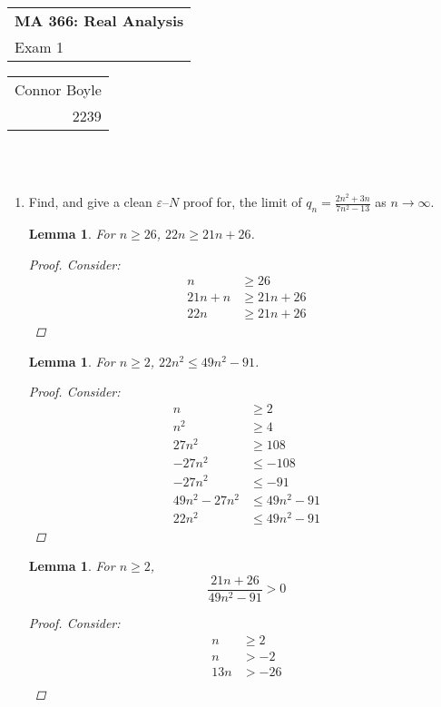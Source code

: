 \documentclass{amsart}
\def\name{Connor Boyle} %
\def\CM{2239} %
\def\hwnum{1} %
\newtheorem{lemma}[theorem]{Lemma}
\begin{document}
\noindent
\thispagestyle{firststyle}
\begin{tabular}{l}
{\LARGE \textbf{MA 366: Real Analysis} }\\
{\Large Exam \hwnum}
\end{tabular} \hfill \begin{tabular}{r}
                        \name \\
                        \CM
                        \end{tabular}

\noindent \hrulefill \\\\
\begin{enumerate}[1.]
\item Find, and give a clean $\varepsilon$--$N$ proof for, the limit of $\displaystyle  q_n=\frac{2n^2+3n}{7n^2-13}$ as $n \to \infty$.
\begin{lemma}
	For $n \geq 26$, $22n \geq 21n + 26$.
	\begin{proof}
		Consider:
		\begin{align*}
			n &\geq 26 \\
			21n + n &\geq 21n + 26 \\
			22n &\geq 21n + 26
		\end{align*}
	\end{proof}
\end{lemma}
\begin{lemma}
	For $n\geq 2$, $22n^2 \leq 49n^2 - 91$.
	\begin{proof}
		Consider:
		\begin{align*}
			n &\geq 2 \\
			n^2 &\geq 4 \\
			27n^2 &\geq 108 \\
			-27n^2 &\leq -108 \\
			-27n^2 &\leq -91 \\
			49n^2 -27n^2 &\leq 49n^2 -91 \\
			22n^2 &\leq 49n^2 -91
		\end{align*}
	\end{proof}
\end{lemma}
\begin{lemma}
	For $n\geq 2$, 
	\[
		\frac{21n + 26}{49n^2 -91} > 0	
	\]
	\begin{proof}
		Consider:
		\begin{align*}
			n &\geq 2 \\
			n &> -2 \\
			13n &> -26 \\

\end{align*}
\end{proof}
\end{lemma}
\end{enumerate}
\end{document}
